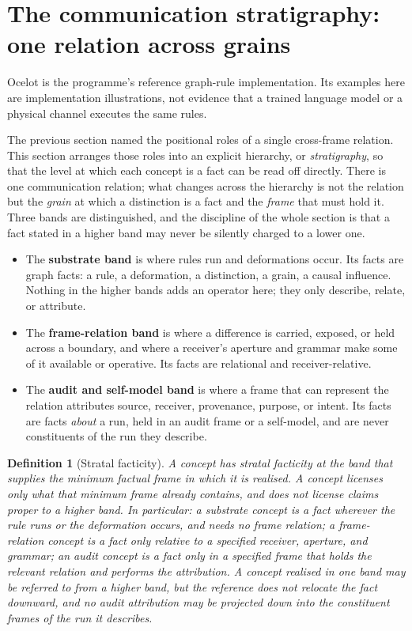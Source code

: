 \documentclass[11pt,a4paper]{article}
\newtheorem{definition}{Definition}[section]
\theoremstyle{remark}\newtheorem{remark}[definition]{Remark}
\begin{document}
\section{The communication stratigraphy: one relation across grains}\label{sec:stratigraphy}
Ocelot is the programme's reference graph-rule implementation. Its examples
here are implementation illustrations, not evidence that a trained language
model or a physical channel executes the same rules.


The previous section named the positional roles of a single cross-frame relation.
This section arranges those roles into an explicit hierarchy, or
\emph{stratigraphy}, so that the level at which each concept is a fact can be read
off directly. There is one communication relation; what changes across the
hierarchy is not the relation but the \emph{grain} at which a distinction is a
fact and the \emph{frame} that must hold it. Three bands are distinguished, and
the discipline of the whole section is that a fact stated in a higher band may
never be silently charged to a lower one.

\begin{itemize}[leftmargin=*]
\item The \textbf{substrate band} is where rules run and deformations occur. Its
facts are graph facts: a rule, a deformation, a distinction, a grain, a causal
influence. Nothing in the higher bands adds an operator here; they only describe,
relate, or attribute.
\item The \textbf{frame-relation band} is where a difference is carried, exposed,
or held across a boundary, and where a receiver's aperture and grammar make some
of it available or operative. Its facts are relational and receiver-relative.
\item The \textbf{audit and self-model band} is where a frame that can represent
the relation attributes source, receiver, provenance, purpose, or intent. Its
facts are facts \emph{about} a run, held in an audit frame or a self-model, and
are never constituents of the run they describe.
\end{itemize}

\begin{definition}[Stratal facticity]\label{def:stratal-facticity}
A concept has \emph{stratal facticity} at the band that supplies the minimum
factual frame in which it is realised. A concept licenses only what that minimum
frame already contains, and does not license claims proper to a higher band. In
particular: a substrate concept is a fact wherever the rule runs or the
deformation occurs, and needs no frame relation; a frame-relation concept is a
fact only relative to a specified receiver, aperture, and grammar; an
audit concept is a fact only in a specified frame that holds the relevant relation
and performs the attribution. A concept realised in one band may be
\emph{referred to} from a higher band, but the reference does not relocate the
fact downward, and no audit attribution may be projected down into the
constituent frames of the run it describes.
\end{definition}
\end{document}
